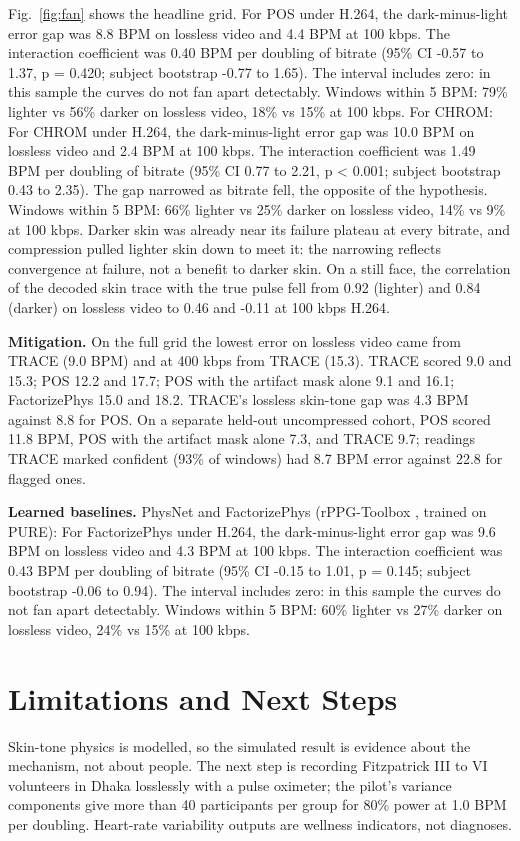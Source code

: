 \documentclass[conference]{IEEEtran}
\begin{document}
Fig.~\ref{fig:fan} shows the headline grid. For POS under H.264, the dark-minus-light error gap was 8.8 BPM on lossless video and 4.4 BPM at 100 kbps. The interaction coefficient was 0.40 BPM per doubling of bitrate (95\% CI -0.57 to 1.37, p = 0.420; subject bootstrap -0.77 to 1.65). The interval includes zero: in this sample the curves do not fan apart detectably. Windows within 5 BPM: 79\% lighter vs 56\% darker on lossless video, 18\% vs 15\% at 100 kbps. For CHROM: For CHROM under H.264, the dark-minus-light error gap was 10.0 BPM on lossless video and 2.4 BPM at 100 kbps. The interaction coefficient was 1.49 BPM per doubling of bitrate (95\% CI 0.77 to 2.21, p < 0.001; subject bootstrap 0.43 to 2.35). The gap narrowed as bitrate fell, the opposite of the hypothesis. Windows within 5 BPM: 66\% lighter vs 25\% darker on lossless video, 14\% vs 9\% at 100 kbps. Darker skin was already near its failure plateau at every bitrate, and compression pulled lighter skin down to meet it: the narrowing reflects convergence at failure, not a benefit to darker skin. On a still face, the correlation of the decoded skin trace with the true pulse fell from 0.92 (lighter) and 0.84 (darker) on lossless video to 0.46 and -0.11 at 100 kbps H.264.

\textbf{Mitigation.} On the full grid the lowest error on lossless video came from TRACE (9.0 BPM) and at 400 kbps from TRACE (15.3). TRACE scored 9.0 and 15.3; POS 12.2 and 17.7; POS with the artifact mask alone 9.1 and 16.1; FactorizePhys 15.0 and 18.2. TRACE's lossless skin-tone gap was 4.3 BPM against 8.8 for POS. On a separate held-out uncompressed cohort, POS scored 11.8 BPM, POS with the artifact mask alone 7.3, and TRACE 9.7; readings TRACE marked confident (93\% of windows) had 8.7 BPM error against 22.8 for flagged ones.

\textbf{Learned baselines.} PhysNet and FactorizePhys (rPPG-Toolbox \cite{liu2023}, trained on PURE): For FactorizePhys under H.264, the dark-minus-light error gap was 9.6 BPM on lossless video and 4.3 BPM at 100 kbps. The interaction coefficient was 0.43 BPM per doubling of bitrate (95\% CI -0.15 to 1.01, p = 0.145; subject bootstrap -0.06 to 0.94). The interval includes zero: in this sample the curves do not fan apart detectably. Windows within 5 BPM: 60\% lighter vs 27\% darker on lossless video, 24\% vs 15\% at 100 kbps.

\section{Limitations and Next Steps}
Skin-tone physics is modelled, so the simulated result is evidence about the mechanism, not about people. The next step is recording Fitzpatrick III to VI volunteers in Dhaka losslessly with a pulse oximeter; the pilot's variance components give more than 40 participants per group for 80\% power at 1.0 BPM per doubling. Heart-rate variability outputs are wellness indicators, not diagnoses.
\end{document}
